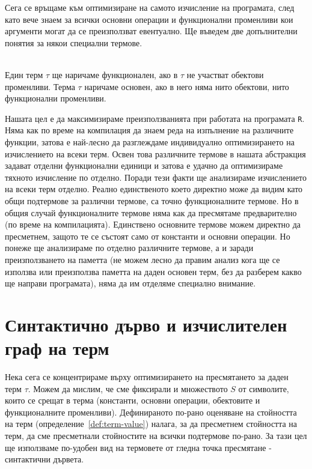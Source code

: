\documentclass[12pt,twoside,a4paper]{article}
\begin{document}
	Сега се връщаме към оптимизиране на самото изчисление на програмата, след като вече знаем за всички основни операции и функционални променливи кои аргументи могат да се преизползват евентуално. Ще въведем две допълнителни понятия за някои специални термове.
	
	\begin{definitions}\label{def:type-of-terms}~\\
		\indent Един терм $\tau$ ще наричаме функционален, ако в $\tau$ не участват обектови променливи. Терма $\tau$ наричаме основен, ако в него няма нито обектови, нито функционални променливи.
	\end{definitions}
	
	Нашата цел е да максимизираме преизползванията при работата на програмата \texttt{R}. Няма как по време на компилация да знаем реда на изпълнение на различните функции, затова е най-лесно да разглеждаме индивидуално оптимизирането на изчислението на всеки терм. Освен това различните термове в нашата абстракция задават отделни функционални единици и затова е удачно да оптимизираме тяхното изчисление по отделно. Поради тези факти ще анализираме изчислението на всеки терм отделно. Реално единственото което директно може да видим като общи подтермове за различни термове, са точно функционалните термове. Но в общия случай функционалните термове няма как да пресмятаме предварително (по време на компилацията). Единствено основните термове можем директно да пресметнем, защото те се състоят само от константи и основни операции. Но понеже ще анализираме по отделно различните термове, а и заради преизползването на паметта (не можем лесно да правим анализ кога ще се използва или преизползва паметта на даден основен терм, без да разберем какво ще направи програмата), няма да им отделяме специално внимание.
	
	\section{Синтактично дърво и изчислителен граф на терм}
	\thispagestyle{style}
	
	Нека сега се концентрираме върху оптимизирането на пресмятането за даден терм $\tau$. Можем да мислим, че сме фиксирали и множеството $S$ от символите, които се срещат в терма (константи, основни операции, обектовите и функционалните променливи). Дефинираното по-рано оценяване на стойността на терм (определение~\ref{def:term-value}) налага, за да пресметнем стойността на терм, да сме пресметнали стойностите на всички подтермове по-рано. За тази цел ще използваме по-удобен вид на термовете от гледна точка пресмятане - синтактични дървета.
	
\end{document}

